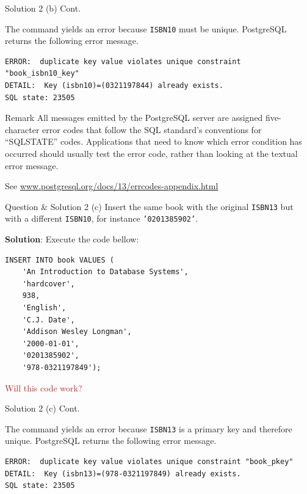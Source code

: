\begin{frame}[fragile]{Solution 2 (b) Cont.}

The command yields an error because \texttt{ISBN10} must be unique. PostgreSQL returns the following error message.

\begin{lstlisting}[style=error]
ERROR:  duplicate key value violates unique constraint "book_isbn10_key"
DETAIL:  Key (isbn10)=(0321197844) already exists.
SQL state: 23505
\end{lstlisting}

\begin{block}{Remark} 
All messages emitted by the PostgreSQL server are assigned five-character error codes that follow the SQL standard's conventions for ``SQLSTATE'' codes. Applications that need to know which error condition has occurred should usually test the error code, rather than looking at the textual error message. \vspace{10pt}

See \url{www.postgresql.org/docs/13/errcodes-appendix.html}
\end{block}
\end{frame}

\begin{frame}[fragile]{Question \& Solution 2 (c)}
Insert the same book  with the original \texttt{ISBN13} but with a different \texttt{ISBN10}, for instance \texttt{'0201385902'}.\vspace{10pt}

\textbf{Solution}: Execute the code bellow:

\begin{lstlisting}
INSERT INTO book VALUES (
	'An Introduction to Database Systems', 
	'hardcover',
	938,
	'English',
	'C.J. Date',
	'Addison Wesley Longman',
	'2000-01-01',
	'0201385902',
	'978-0321197849');
\end{lstlisting}

\textcolor{brown}{Will this code work?}
\end{frame}

\begin{frame}[fragile]{Solution 2 (c) Cont.}

The command yields an error  because  \texttt{ISBN13} is a primary key and therefore unique. PostgreSQL returns the following error message.

\begin{lstlisting}[style=error]
ERROR:  duplicate key value violates unique constraint "book_pkey"
DETAIL:  Key (isbn13)=(978-0321197849) already exists.
SQL state: 23505
\end{lstlisting}
\end{frame}


